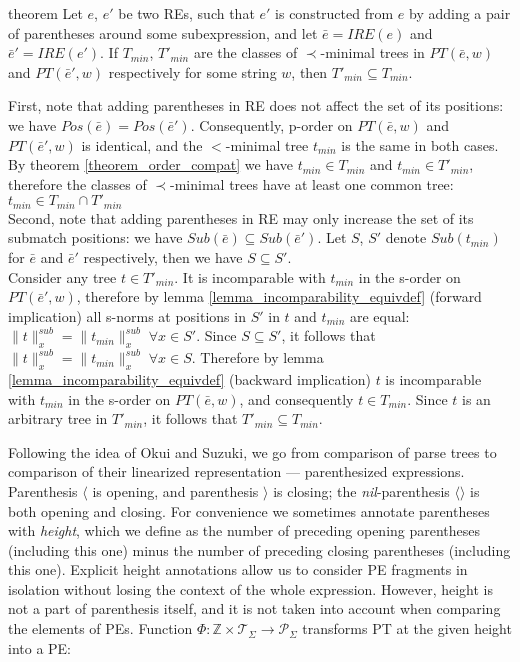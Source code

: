 \documentclass[AMA,STIX1COL]{WileyNJD-v2}
\newcommand{\Xl}{\langle}
\newcommand{\Xr}{\rangle}
\newcommand{\Xm}{\langle\!\rangle}
\newcommand{\XP}{\mathcal{P}}
\newcommand{\XT}{\mathcal{T}}
\newcommand{\YZ}{\mathbb{Z}}
\newcommand{\PT}{PT}
\newcommand{\IRE}{I\!RE}
\newcommand{\snorm}[2]{\|{#1}\|^{sub}_{#2}}
\begin{document}
\begin{theoremEnd}[restate, no link to proof, no link to theorem, category=theorem_order_compat]{theorem}
    \label{theorem_submatch_refinement}
    Let $e$, $e'$ be two REs, such that $e'$ is constructed from $e$ by adding a pair of parentheses around some subexpression,
    and let $\bar{e} = \IRE(e)$ and $\bar{e}' = \IRE(e')$.
    If $T_{min}$, $T'_{min}$ are the classes of $\prec$-minimal trees
    in $\PT(\bar{e}, w)$ and $\PT(\bar{e}', w)$ respectively for some string $w$,
    then $T'_{min} \subseteq T_{min}$.
\end{theoremEnd}
\begin{proofEnd}
    First, note that adding parentheses in RE
    does not affect the set of its positions: we have $Pos(\bar{e}) = Pos(\bar{e}')$.
    Consequently, p-order on $\PT(\bar{e}, w)$ and $\PT(\bar{e}', w)$ is identical,
    and the $<$-minimal tree $t_{min}$ is the same in both cases.
    By theorem \ref{theorem_order_compat} we have $t_{min} \in T_{min}$ and $t_{min} \in T'_{min}$,
    therefore the classes of $\prec$-minimal trees have at least one common tree: $t_{min} \in T_{min} \cap T'_{min}$
    \\[0.5em]
    Second, note that adding parentheses in RE
    may only increase the set of its submatch positions: we have $Sub(\bar{e}) \subseteq Sub(\bar{e}')$.
    Let $S$, $S'$ denote $Sub(t_{min})$ for $\bar{e}$ and $\bar{e}'$ respectively,
    then we have $S \subseteq S'$.
    \\[0.5em]
    Consider any tree $t \in T'_{min}$.
    It is incomparable with $t_{min}$ in the s-order on $\PT(\bar{e}', w)$,
    therefore by lemma \ref{lemma_incomparability_equivdef} (forward implication)
    all s-norms at positions in $S'$ in $t$ and $t_{min}$ are equal: $\snorm{t}{x} = \snorm{t_{min}}{x} \; \forall x \in S'$.
    Since $S \subseteq S'$, it follows that $\snorm{t}{x} = \snorm{t_{min}}{x} \; \forall x \in S$.
    Therefore by lemma \ref{lemma_incomparability_equivdef} (backward implication)
    $t$ is incomparable with $t_{min}$ in the s-order on $\PT(\bar{e}, w)$,
    and consequently $t \in T_{min}$.
    Since $t$ is an arbitrary tree in $T'_{min}$, it follows that $T'_{min} \subseteq T_{min}$.
\end{proofEnd}

Following the idea of Okui and Suzuki,
we go from comparison of parse trees to comparison of their linearized representation --- parenthesized expressions.
Parenthesis $\Xl$ is opening, and
parenthesis $\Xr$ is closing;
the \emph{nil}-parenthesis $\Xm$ is both opening and closing.
For convenience we sometimes annotate parentheses with \emph{height},
which we define as the number of preceding opening parentheses (including this one)
minus the number of preceding closing parentheses (including this one).
Explicit height annotations allow us to consider PE fragments in isolation
without losing the context of the whole expression.
However, height is not a part of parenthesis itself,
and it is not taken into account when comparing the elements of PEs.
Function $\Phi : \YZ \times \XT_\Sigma \rightarrow \XP_\Sigma$ transforms PT at the given height into a PE:
\end{document}
